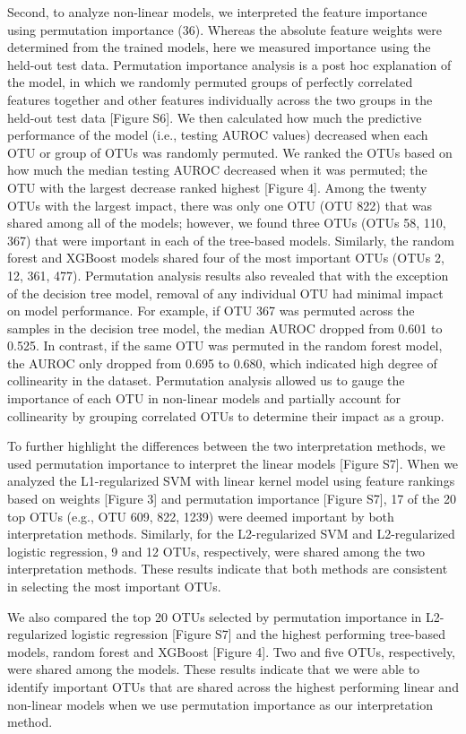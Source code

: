 \documentclass[
  11pt,
]{article}
\begin{document}
Second, to analyze non-linear models, we interpreted the feature
importance using permutation importance (36). Whereas the absolute
feature weights were determined from the trained models, here we
measured importance using the held-out test data. Permutation importance
analysis is a post hoc explanation of the model, in which we randomly
permuted groups of perfectly correlated features together and other
features individually across the two groups in the held-out test data
{[}Figure S6{]}. We then calculated how much the predictive performance
of the model (i.e., testing AUROC values) decreased when each OTU or
group of OTUs was randomly permuted. We ranked the OTUs based on how
much the median testing AUROC decreased when it was permuted; the OTU
with the largest decrease ranked highest {[}Figure 4{]}. Among the
twenty OTUs with the largest impact, there was only one OTU (OTU 822)
that was shared among all of the models; however, we found three OTUs
(OTUs 58, 110, 367) that were important in each of the tree-based
models. Similarly, the random forest and XGBoost models shared four of
the most important OTUs (OTUs 2, 12, 361, 477). Permutation analysis
results also revealed that with the exception of the decision tree
model, removal of any individual OTU had minimal impact on model
performance. For example, if OTU 367 was permuted across the samples in
the decision tree model, the median AUROC dropped from 0.601 to 0.525.
In contrast, if the same OTU was permuted in the random forest model,
the AUROC only dropped from 0.695 to 0.680, which indicated high degree
of collinearity in the dataset. Permutation analysis allowed us to gauge
the importance of each OTU in non-linear models and partially account
for collinearity by grouping correlated OTUs to determine their impact
as a group.

To further highlight the differences between the two interpretation
methods, we used permutation importance to interpret the linear models
{[}Figure S7{]}. When we analyzed the L1-regularized SVM with linear
kernel model using feature rankings based on weights {[}Figure 3{]} and
permutation importance {[}Figure S7{]}, 17 of the 20 top OTUs (e.g., OTU
609, 822, 1239) were deemed important by both interpretation methods.
Similarly, for the L2-regularized SVM and L2-regularized logistic
regression, 9 and 12 OTUs, respectively, were shared among the two
interpretation methods. These results indicate that both methods are
consistent in selecting the most important OTUs.

We also compared the top 20 OTUs selected by permutation importance in
L2-regularized logistic regression {[}Figure S7{]} and the highest
performing tree-based models, random forest and XGBoost {[}Figure 4{]}.
Two and five OTUs, respectively, were shared among the models. These
results indicate that we were able to identify important OTUs that are
shared across the highest performing linear and non-linear models when
we use permutation importance as our interpretation method.
\end{document}
